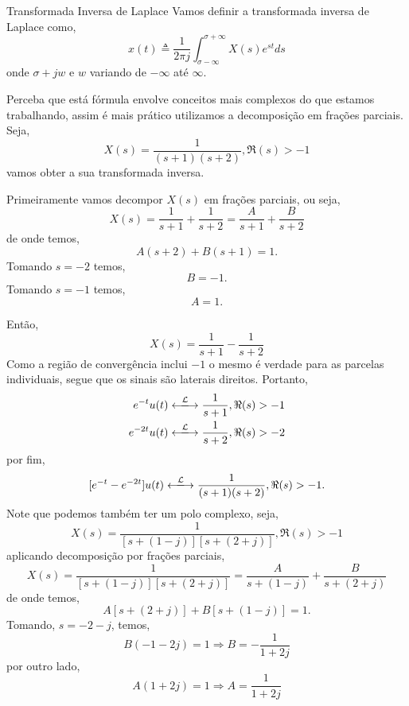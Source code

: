 \documentclass[9pt]{beamer}
\begin{document}
\begin{frame}{Transformada Inversa de Laplace}
  Vamos definir a transformada inversa de Laplace como,
 $$ x (t) \triangleq \frac {1} {2 \pi j} \int_{ \sigma -\infty}^{ \sigma + \infty} X(s) e^{st} ds $$ 
 onde $ \sigma + jw $ e $w$ variando de  $-\infty$ at\'{e} $\infty.$ 
 \par
 Perceba que est\'{a}  f\'{o}rmula envolve conceitos mais complexos  do que estamos trabalhando, assim \'{e} mais pr\'{a}tico utilizamos  a decomposi\c{c}\~{a}o em fra\c{c}\~{o}es parciais. Seja,  
 $$ X(s) \equal \frac {1} {(s + 1) (s + 2)}, \Re (s) > -1 $$
 vamos obter a sua transformada inversa.
 \par
 Primeiramente vamos decompor $ X(s)$ em fra\c{c}\~{o}es parciais, ou seja,
 $$ X(s) \equal \frac {1} {s + 1} + \frac {1} {s + 2} \equal \frac {A} {s + 1} + \frac {B} {s + 2} $$
 de onde temos,
 $$ A(s + 2) + B(s +1) \equal 1.$$
 Tomando $s \equal -2 $ temos,
 $$B = -1. $$
 Tomando $s \equal -1$ temos,
 $$A \equal 1. $$
 \end{frame}
 \begin{frame}
  Ent\~{a}o,
 $$ X(s) \equal \frac {1} {s + 1} - \frac {1} {s + 2} $$
 Como a regi\~{a}o de converg\^{e}ncia inclui $-1$ o mesmo  \'{e} verdade para as parcelas individuais, segue que os sinais s\~{a}o laterais direitos. Portanto,
 \begin{eqnarray}
   e^{-t} u(t) \xlongleftrightarrow {\mathcal{L}} \frac {1} {s + 1}, \Re (s) > -1 \nonumber \\
   e^{-2t} u(t) \xlongleftrightarrow {\mathcal{L}} \frac {1} {s +2 }, \Re (s) > -2 \nonumber 
 \end{eqnarray}
 por fim, 
 $$ [ e^{-t} -e^{-2t}] u(t) \xlongleftrightarrow {\mathcal{L}} \frac {1} {(s + 1)(s + 2)}, \Re (s) > -1. $$
 Note que podemos tamb\'{e}m ter um polo complexo, seja, 
 $$ X(s) \equal \frac {1} { \left [ s + (1 -j) \right] \left [s + (2 + j) \right ]},  \Re (s) > -1 $$
 aplicando decomposi\c{c}\~{a}o por fra\c{c}\~{o}es parciais, 
 $$ X(s) \equal \frac {1} { \left [ s + (1 -j) \right] \left [s + (2 + j) \right ]} \equal \frac {A} { s + (1 -j)} + \frac {B} {s + (2 +j)} $$
 de onde temos,
 $$ A [s + (2 + j) ] + B [ s + (1 -j)] = 1 .$$
 Tomando, $ s \equal -2 -j $, temos,
 $$B( -1 -2j) \equal 1 \Rightarrow B \equal  -\frac {1} {1 + 2j} $$ 
 por outro lado,
 $$A(1 + 2j) \equal 1 \Rightarrow A \equal \frac {1} {1 + 2j}$$
 \end{frame}
\end{document}
